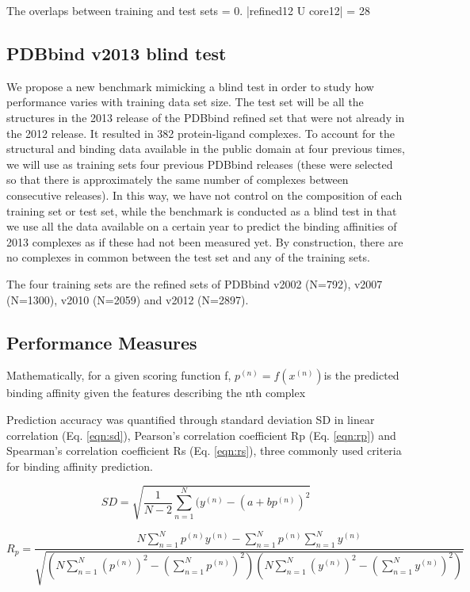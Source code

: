 \documentclass[journal=jacsat,manuscript=article]{achemso}
\begin{document}
The overlaps between training and test sets = 0. |refined12 U core12| = 28

\subsection{PDBbind v2013 blind test}

We propose a new benchmark mimicking a blind test in order to study how performance varies with training data set size. The test set will be all the structures in the 2013 release of the PDBbind refined set that were not already in the 2012 release. It resulted in 382 protein-ligand complexes. To account for the structural and binding data available in the public domain at four previous times, we will use as training sets four previous PDBbind releases (these were selected so that there is approximately the same number of complexes between consecutive releases). In this way, we have not control on the composition of each training set or test set, while the benchmark is conducted as a blind test in that we use all the data available on a certain year to predict the binding affinities of 2013 complexes as if these had not been measured yet. By construction, there are no complexes in common between the test set and any of the training sets. 

The four training sets are the refined sets of PDBbind v2002 (N=792), v2007 (N=1300), v2010 (N=2059) and v2012 (N=2897).

\subsection{Performance Measures}

Mathematically, for a given scoring function f, $p^{(n)}=f(x^{(n)})$is the predicted binding affinity given the features   describing the nth complex 

Prediction accuracy was quantified through standard deviation SD in linear correlation (Eq. \ref{eqn:sd}), Pearson's correlation coefficient Rp (Eq. \ref{eqn:rp}) and Spearman's correlation coefficient Rs (Eq. \ref{eqn:rs}), three commonly used criteria for binding affinity prediction.

\begin{equation}
SD = \sqrt{\frac{1}{N-2}\sum_{n=1}^N(y^{(n)}-(a+bp^{(n)})^2}
\label{eqn:sd}
\end{equation}

\begin{equation}
R_p = \frac{N\sum_{n=1}^Np^{(n)}y^{(n)}-\sum_{n=1}^Np^{(n)}\sum_{n=1}^Ny^{(n)}}{\sqrt{(N\sum_{n=1}^N(p^{(n)})^2-(\sum_{n=1}^Np^{(n)})^2)(N\sum_{n=1}^N(y^{(n)})^2-(\sum_{n=1}^Ny^{(n)})^2)}}
\label{eqn:rp}
\end{equation}
\end{document}
